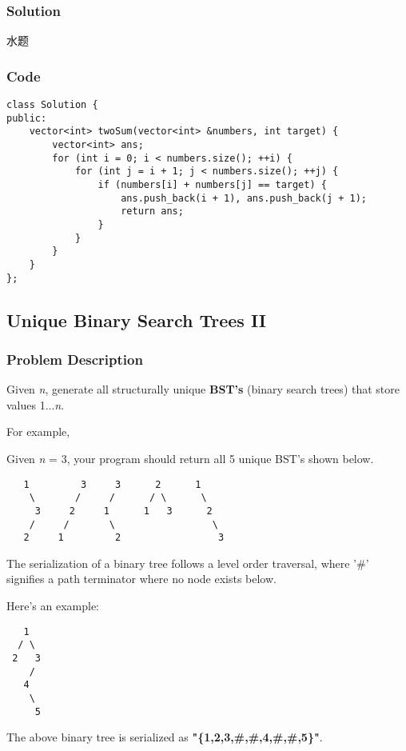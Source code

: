 \documentclass{article}
\begin{document}
\begin{CJK*}{UTF8}{gkai}
\subsubsection*{Solution}
水题

\subsubsection*{Code}
\begin{lstlisting}
class Solution {
public:
    vector<int> twoSum(vector<int> &numbers, int target) {
        vector<int> ans;
        for (int i = 0; i < numbers.size(); ++i) {
            for (int j = i + 1; j < numbers.size(); ++j) {
                if (numbers[i] + numbers[j] == target) {
                    ans.push_back(i + 1), ans.push_back(j + 1);
                    return ans;
                }
            }
        }
    }
}; 
\end{lstlisting}


\subsection{ Unique Binary Search Trees II }
\label{ Unique Binary Search Trees II }

\subsubsection*{Problem Description}
Given \emph{n}, generate all structurally unique \textbf{BST's} (binary search trees) that store values 1...\emph{n}.

For example,


Given \emph{n} = 3, your program should return all 5 unique BST's shown below.

\begin{verbatim}
   1         3     3      2      1
    \       /     /      / \      \
     3     2     1      1   3      2
    /     /       \                 \
   2     1         2                 3
\end{verbatim}

The serialization of a binary tree follows a level order traversal, where '\#' signifies a path terminator where no node exists below.

Here's an example:


\begin{verbatim}
   1
  / \
 2   3
    /
   4
    \
     5
\end{verbatim}
The above binary tree is serialized as \textbf{"\{1,2,3,\#,\#,4,\#,\#,5\}"}.



\end{CJK*}
\end{document}
